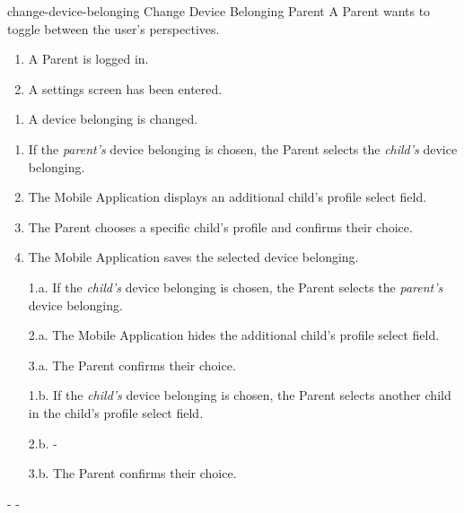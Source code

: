 {change-device-belonging}
{Change Device Belonging}
{Parent}
{A Parent wants to toggle between the user's perspectives.}
{\begin{enumerate} %
    \item A Parent is logged in.
    \item A settings screen has been entered.
\end{enumerate}}
{\begin{enumerate} %
   \item A device belonging is changed.
\end{enumerate}}
{\begin{enumerate} %
   \item If the \textit{parent's} device belonging is chosen, the Parent selects the \textit{child's} device belonging.
   \item The Mobile Application displays an additional child's profile select field.
   \item The Parent chooses a specific child's profile and confirms their choice.
   \item The Mobile Application saves the selected device belonging.
\end{enumerate}}
{\begin{enumerate} %
    \item[1.a.] If the \textit{child's} device belonging is chosen, the Parent selects the \textit{parent's} device belonging.
    \item[2.a.] The Mobile Application hides the additional child's profile select field.
    \item[3.a.] The Parent confirms their choice.
\end{enumerate}
\midrule
\begin{enumerate}
    \item[1.b.] If the \textit{child's} device belonging is chosen, the Parent selects another child in the child's profile select field.
    \item[2.b.] - 
    \item[3.b.] The Parent confirms their choice.
\end{enumerate}}%
{-} %
{-} %

